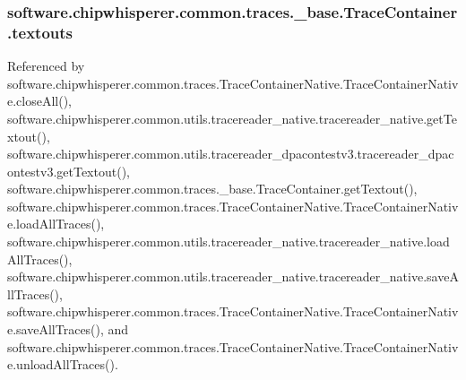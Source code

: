 \hypertarget{classsoftware_1_1chipwhisperer_1_1common_1_1traces_1_1__base_1_1TraceContainer_ab0bd9d68c32f5c0e0d54a9fa34f18c4f}{}
\subsubsection[{textouts}]{\setlength{\rightskip}{0pt plus 5cm}software.\+chipwhisperer.\+common.\+traces.\+\_\+base.\+Trace\+Container.\+textouts}\label{classsoftware_1_1chipwhisperer_1_1common_1_1traces_1_1__base_1_1TraceContainer_ab0bd9d68c32f5c0e0d54a9fa34f18c4f}


Referenced by software.\+chipwhisperer.\+common.\+traces.\+Trace\+Container\+Native.\+Trace\+Container\+Native.\+close\+All(), software.\+chipwhisperer.\+common.\+utils.\+tracereader\+\_\+native.\+tracereader\+\_\+native.\+get\+Textout(), software.\+chipwhisperer.\+common.\+utils.\+tracereader\+\_\+dpacontestv3.\+tracereader\+\_\+dpacontestv3.\+get\+Textout(), software.\+chipwhisperer.\+common.\+traces.\+\_\+base.\+Trace\+Container.\+get\+Textout(), software.\+chipwhisperer.\+common.\+traces.\+Trace\+Container\+Native.\+Trace\+Container\+Native.\+load\+All\+Traces(), software.\+chipwhisperer.\+common.\+utils.\+tracereader\+\_\+native.\+tracereader\+\_\+native.\+load\+All\+Traces(), software.\+chipwhisperer.\+common.\+utils.\+tracereader\+\_\+native.\+tracereader\+\_\+native.\+save\+All\+Traces(), software.\+chipwhisperer.\+common.\+traces.\+Trace\+Container\+Native.\+Trace\+Container\+Native.\+save\+All\+Traces(), and software.\+chipwhisperer.\+common.\+traces.\+Trace\+Container\+Native.\+Trace\+Container\+Native.\+unload\+All\+Traces().

\hypertarget{classsoftware_1_1chipwhisperer_1_1common_1_1traces_1_1__base_1_1TraceContainer_a05023d9e7baaaf1474c3ec3dddbcefa8}{}
